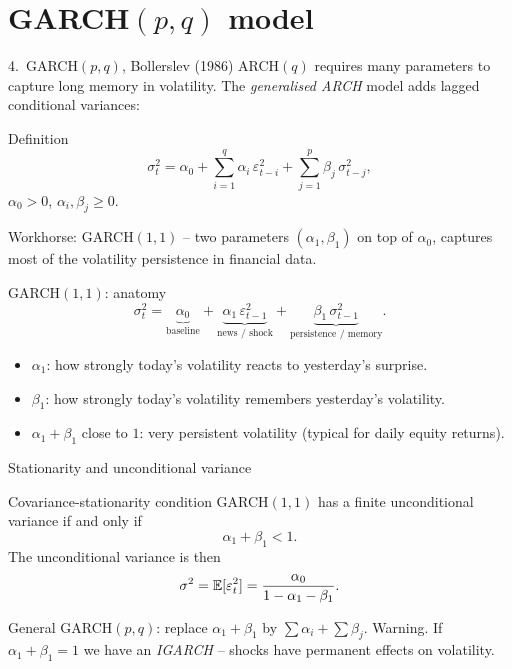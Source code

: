 \documentclass[aspectratio=169]{beamer}
\begin{document}
\section{GARCH$(p, q)$ model}

\begin{frame}{4.~GARCH$(p, q)$, Bollerslev (1986)}
  ARCH$(q)$ requires many parameters to capture long memory in
  volatility. The \emph{generalised ARCH} model adds lagged
  conditional variances:
  \begin{block}{Definition}
    \[
      \sigma_t^2 = \alpha_0
                  + \sum_{i = 1}^{q} \alpha_i\, \varepsilon_{t-i}^2
                  + \sum_{j = 1}^{p} \beta_j\, \sigma_{t-j}^2,
    \]
    $\alpha_0 > 0$, $\alpha_i, \beta_j \geq 0$.
  \end{block}
  \pause
  \alert{Workhorse:} GARCH$(1, 1)$ -- two parameters
  $(\alpha_1, \beta_1)$ on top of $\alpha_0$, captures most of the
  volatility persistence in financial data.
\end{frame}

\begin{frame}{GARCH$(1, 1)$: anatomy}
  \[
    \sigma_t^2
    = \underbrace{\alpha_0}_{\text{baseline}}
    + \underbrace{\alpha_1\, \varepsilon_{t-1}^2}_{\text{news / shock}}
    + \underbrace{\beta_1\, \sigma_{t-1}^2}_{\text{persistence / memory}}.
  \]
  \pause
  \begin{itemize}
    \item $\alpha_1$: how strongly today's volatility reacts to
          yesterday's surprise.
    \item $\beta_1$: how strongly today's volatility remembers
          yesterday's volatility.
    \item $\alpha_1 + \beta_1$ close to $1$: very persistent
          volatility (typical for daily equity returns).
  \end{itemize}
\end{frame}

\begin{frame}{Stationarity and unconditional variance}
  \begin{block}{Covariance-stationarity condition}
    GARCH$(1,1)$ has a finite unconditional variance if and only if
    \[
      \alpha_1 + \beta_1 < 1.
    \]
    The unconditional variance is then
    \[
      \sigma^2 = \mathbb{E}[\varepsilon_t^2]
              = \frac{\alpha_0}{1 - \alpha_1 - \beta_1}.
    \]
  \end{block}
  \pause
  General GARCH$(p, q)$: replace $\alpha_1 + \beta_1$ by
  $\sum \alpha_i + \sum \beta_j$.
  \alert{Warning.} If $\alpha_1 + \beta_1 = 1$ we have an
  \emph{IGARCH} -- shocks have permanent effects on volatility.
\end{frame}
\end{document}
